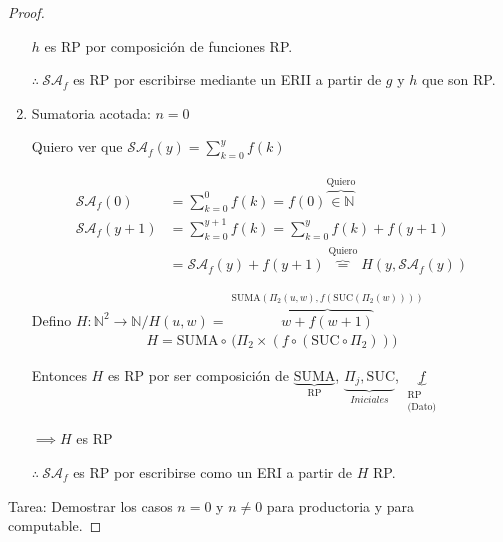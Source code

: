 \begin{proof}
\begin{enumerate}
            $h$ es RP por composición de funciones RP.
            \begin{center}
                $\therefore ~ \mathcal{SA}_f$ es RP por escribirse mediante un
                ERII a partir de $g$ y $h$ que son RP.
            \end{center}

        \item Sumatoria acotada: $n=0$
            
            Quiero ver que $\mathcal{SA}_f (y) = \sum_{k=0}^y f(k)$

            \begin{align*}
                \mathcal{SA}_f(0) &= \sum_{k=0}^0 f(k) = f(0) 
                \overbrace{\in \mathbb{N}}^{\text{Quiero}} \\
                \mathcal{SA}_f(y+1) &= \sum_{k=0}^{y+1} f(k) =
                \sum_{k=0}^{y} f(k) + f(y+1) \\
                &= \mathcal{SA}_f(y) + f(y+1) \overbrace{=}^{\text{Quiero}}
                H(y, \mathcal{SA}_f (y))
            \end{align*}

            Defino $H: \mathbb{N}^2 \to \mathbb{N} / H(u,w) 
            = \overbrace{w + f(w+1)}^{\substack{\mathrm{SUMA}(\Pi_2(u,w),
            f(\mathrm{SUC}(\Pi_2 (w))))}}$
            \begin{gather*}
                H = \mathrm{SUMA} \circ \, \Big(
                \Pi_2 \times (f \circ ( \mathrm{SUC} \circ \Pi_2 ) )
                \Big)
            \end{gather*}

            Entonces $H$ es RP por ser composición de 
            $\underbrace{\mathrm{SUMA}}_{\text{RP}}$,
            $\underbrace{\Pi_j, \mathrm{SUC}}_{Iniciales}$, 
            $\underbrace{f}_{\substack{\text{RP}\\ \text{(Dato)}}}$
            \begin{center}
                $\implies H$ es RP
            \end{center}
            \begin{center}
                $\therefore ~ \mathcal{SA}_f$ es RP por escribirse como un ERI
                a partir de $H$ RP.
            \end{center}
    \end{enumerate}

    Tarea: Demostrar los casos $n=0$ y $n \neq 0$ para productoria y para
    computable.

\end{proof}

